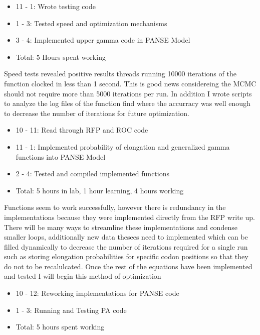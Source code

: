 \documentclass[12pt,hyperref]{labbook}
\begin{document}
\begin{itemize}
    \item 11 - 1: Wrote testing code
    \item 1 - 3: Tested speed and optimization mechanisms
    \item 3 - 4: Implemented upper gamma code in PANSE Model
    \item Total: 5 Hours spent working
\end{itemize}
Speed tests revealed positive results threads running 10000 iterations of the function clocked in less than 1 second. This is good news considereing the MCMC should not require more than 5000 iterations per run. In addition I wrote scripts to analyze the log files of the function find where the accurracy was well enough to decrease the number of iterations for future optimization.
\begin{itemize}
    \item 10 - 11: Read through RFP and ROC code
    \item 11 - 1: Implemented probability of elongation and generalized gamma functions into PANSE Model
    \item 2 - 4: Tested and compiled implemented functions
    \item Total: 5 hours in lab, 1 hour learning, 4 hours working
\end{itemize}
Functions seem to work successfully, however there is redundancy in the implementations because they were implemented directly from the RFP write up. There will be many ways to streamline these implementations and condense smaller loops, additionally new data thesees need to implemented which can be filled dynamically to decrease the number of iterations required for a single run such as storing elongation probabilities for specific codon positions so that they do not to be recalulcated.
Once the rest of the equations have been implemented and tested I will begin this method of optimization
\begin{itemize}
    \item 10 - 12: Reworking implementations for PANSE code
    \item 1 - 3: Running and Testing PA code
    \item Total: 5 hours spent working
\end{itemize}
\end{document}
